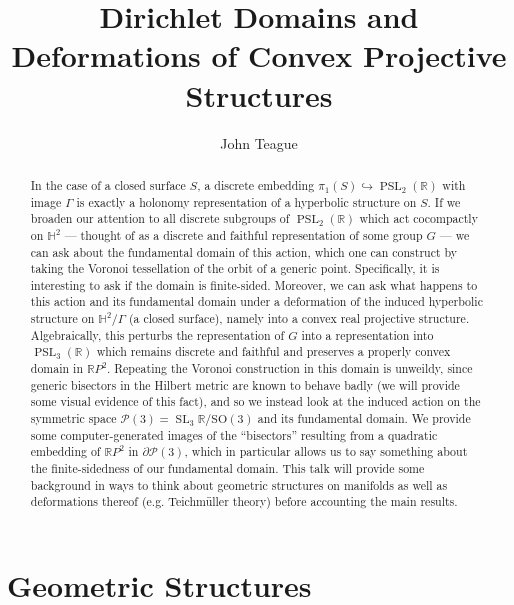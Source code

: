 \documentclass{article}
\title{Dirichlet Domains and Deformations of Convex Projective Structures}
\author{John Teague}
\begin{document}
\maketitle

\begin{abstract}
	In the case of a closed surface $S$, a discrete embedding $\pi_1(S) \hookrightarrow \operatorname{PSL}_2(\mathbb{R})$ with image $\Gamma$ is exactly a holonomy representation of a hyperbolic structure on $S$. If we broaden our attention to all discrete subgroups of $\operatorname{PSL}_2(\mathbb{R})$ which act cocompactly on $\mathbb{H}^2$ --- thought of as a discrete and faithful representation of some group $G$ --- we can ask about the fundamental domain of this action, which one can construct by taking the Voronoi tessellation of the orbit of a generic point. Specifically, it is interesting to ask if the domain is finite-sided. Moreover, we can ask what happens to this action and its fundamental domain under a deformation of the induced hyperbolic structure on $\mathbb{H}^2/\Gamma$ (a closed surface), namely into a convex real projective structure. Algebraically, this perturbs the representation of $G$ into a representation into $\operatorname{PSL}_3(\mathbb{R})$ which remains discrete and faithful and preserves a properly convex domain in $\mathbb{R}P^2$. Repeating the Voronoi construction in this domain is unweildy, since generic bisectors in the Hilbert metric are known to behave badly (we will provide some visual evidence of this fact), and so we instead look at the induced action on the symmetric space $\mathcal{P}(3) = \operatorname{SL}_3\mathbb{R}/\operatorname{SO(3)}$ and its fundamental domain. We provide some computer-generated images of the ``bisectors'' resulting from a quadratic embedding of $\mathbb{R}P^2$ in $\partial \mathcal{P}(3)$, which in particular allows us to say something about the finite-sidedness of our fundamental domain. This talk will provide some background in ways to think about geometric structures on manifolds as well as deformations thereof (e.g. Teichmüller theory) before accounting the main results.
\end{abstract}

\section{Geometric Structures}
\end{document}
